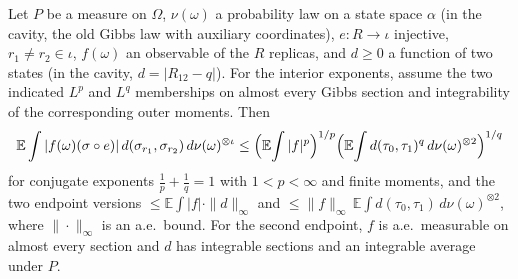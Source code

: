 \begin{theorem}\label{thm:sg-tal:perceptron-pair-holder}
  \leanok
{}
Let $P$ be a measure on $\Omega$, $\nu(\omega)$ a probability law on a state space $\alpha$ (in the cavity, the old Gibbs law with auxiliary coordinates), $e:R\to\iota$ injective, $r_1\ne r_2\in\iota$,
$f(\omega)$ an observable of the $R$ replicas, and $d\ge0$ a function of two states
(in the cavity, $d=|R_{12}-q|$). For the interior exponents, assume the two indicated
$L^p$ and $L^q$ memberships on almost every Gibbs section and integrability of the corresponding
outer moments. Then
\[
 \mathbb E\int|f(\omega)(\sigma\circ e)|\,d(\sigma_{r_1},\sigma_{r_2})\,d\nu(\omega)^{\otimes\iota}\le\Bigl(\mathbb E\!\int|f|^p\Bigr)^{1/p}\Bigl(\mathbb E\!\int d(\tau_0,\tau_1)^q\,d\nu(\omega)^{\otimes2}\Bigr)^{1/q}
\]
for conjugate exponents $\tfrac1p+\tfrac1q=1$ with $1<p<\infty$ and finite moments, and the two endpoint versions
$\le\mathbb E\int|f|\cdot\|d\|_\infty$ and $\le\|f\|_\infty\,\mathbb E\int d(\tau_0,\tau_1)\,d\nu(\omega)^{\otimes2}$, where $\|\cdot\|_\infty$ is an a.e.\ bound. For the second endpoint, $f$ is a.e.\ measurable on almost every section and $d$ has integrable sections and an integrable average under $P$.
\end{theorem}
